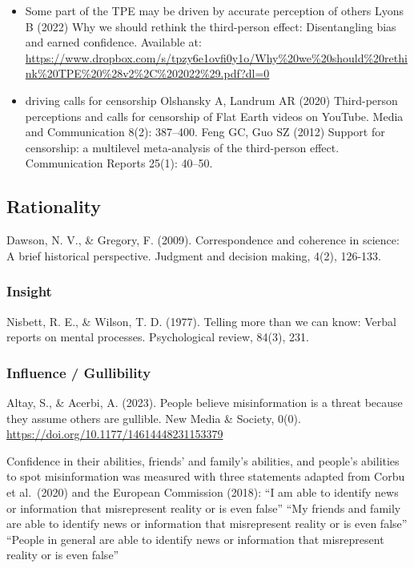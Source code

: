 \documentclass[
  ,jou,floatsintext]{apa6}
\begin{document}
\begin{itemize}
\item
  Some part of the TPE may be driven by accurate perception of others
  Lyons B (2022) Why we should rethink the third-person effect: Disentangling bias and earned confidence. Available at: \url{https://www.dropbox.com/s/tpzy6e1ovfi0y1o/Why\%20we\%20should\%20rethink\%20TPE\%20\%28v2\%2C\%202022\%29.pdf?dl=0}
\item
  driving calls for censorship
  Olshansky A, Landrum AR (2020) Third-person perceptions and calls for censorship of Flat Earth videos on YouTube. Media and Communication 8(2): 387--400.
  Feng GC, Guo SZ (2012) Support for censorship: a multilevel meta-analysis of the third-person effect. Communication Reports 25(1): 40--50.
\end{itemize}

\hypertarget{rationality}{%
\subsection{Rationality}\label{rationality}}

Dawson, N. V., \& Gregory, F. (2009). Correspondence and coherence in science: A brief historical perspective. Judgment and decision making, 4(2), 126-133.

\hypertarget{insight}{%
\subsubsection{Insight}\label{insight}}

Nisbett, R. E., \& Wilson, T. D. (1977). Telling more than we can know: Verbal reports on mental processes. Psychological review, 84(3), 231.

\hypertarget{influence-gullibility}{%
\subsubsection{Influence / Gullibility}\label{influence-gullibility}}

Altay, S., \& Acerbi, A. (2023). People believe misinformation is a threat because they assume others are gullible. New Media \& Society, 0(0). \url{https://doi.org/10.1177/14614448231153379}

Confidence in their abilities, friends' and family's abilities, and people's abilities to spot misinformation was measured with three statements adapted from Corbu et al.~(2020) and the European Commission (2018):
``I am able to identify news or information that misrepresent reality or is even false''
``My friends and family are able to identify news or information that misrepresent reality or is even false''
``People in general are able to identify news or information that misrepresent reality or is even false''
\end{document}
